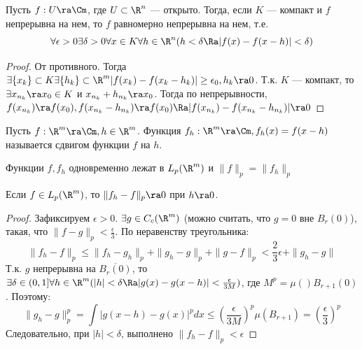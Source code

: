 
\begin{theorem}[Кантора]
    Пусть \(f: U \ra \Cm\), где \(U \subset \R^n\) --- открыто. Тогда, если \(K\) --- компакт и \(f\) непрерывна на нем, то \(f\) равномерно непрерывна на нем, т.е.
    \[\forall \epsilon > 0 \exists \delta > 0 \forall x \in K \forall h \in \R^n (h < \delta \Ra |f(x) - f(x - h)| < \delta)\]
\end{theorem}
\begin{proof}
    От противного. Тогда \(\exists \{x_k\} \subset K \exists \{h_k\} \subset \R^m |f(x_k) - f(x_k - h_k)| \ge \epsilon_0, h_k \ra 0\). Т.к. \(K\) --- компакт, то \(\exists x_{n_k} \ra x_0 \in K\) и \(x_{n_k} + h_{n_k} \ra x_0\). Тогда по непрерывности, \(f(x_{n_k}) \ra f(x_0), f(x_{n_k} - h_{n_k}) \ra f(x_0) \Ra |f(x_{n_k}) - f(x_{n_k} - h_{n_k})| \ra 0\)
\end{proof}

\begin{definition}
    Пусть \(f: \R^m \ra \Cm, h \in \R^m\). Функция \(f_h: \R^m \ra \Cm, f_h(x) = f(x - h)\) называется сдвигом функции \(f\) на \(h\).
\end{definition}

\begin{note}
    Функции \(f, f_h\) одновременно лежат в \(L_p(\R^m)\) и \(\|f\|_p = \|f_h\|_p\)
\end{note}

\begin{theorem}
    Если \(f \in L_p(\R^m)\), то \(\|f_h - f\|_p \ra 0\) при \(h \ra 0\).
\end{theorem}
\begin{proof}
    Зафиксируем \(\epsilon > 0\). \(\exists g \in C_c(\R^m)\) (можно считать, что \(g = 0\) вне \(B_r(0)\)), такая, что \(\|f - g\|_p < \frac{\epsilon}{3}\). По неравенству треугольника:
    \[\|f_h - f\|_p \le \|f_h - g_h\|_p + \|g_h - g\|_p + \|g - f\|_p < \frac{2}{3}\epsilon + \|g_h - g\|\]
    Т.к. \(g\) непрерывна на \(\overline{B_r(0)}\), то \(\exists \delta \in (0, 1] \forall h \in \R^m (|h| < \delta \Ra |g(x) - g(x - h)| < \frac{\epsilon}{3M})\), где \(M^p = \mu()B_{r + 1}(0)\). Поэтому:
    \[\|g_h - g\|^p_p = \int |g(x - h) - g(x)|^pdx \le \left( \frac{\epsilon}{3M} \right)^p\mu(B_{r + 1}) = \left( \frac{\epsilon}{3} \right)^p\]
    Следовательно, при \(|h| < \delta\), выполнено \(\|f_h - f\|_p < \epsilon\)
\end{proof}

